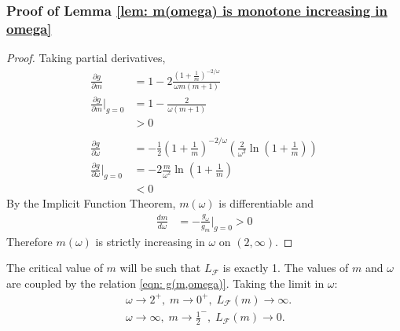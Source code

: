 \documentclass[10pt]{article}
\begin{document}
\subsubsection*{Proof of Lemma \ref{lem: m(omega) is monotone increasing in omega}}
\begin{proof}
Taking partial derivatives,
    \begin{align*}
        \frac{\partial g}{\partial m} &= 1-2\frac{(1+\frac{1}{m})^{-2/\omega}}{\omega m(m+1)}\\
        \frac{\partial g}{\partial m}\Bigg|_{g=0} &= 1-\frac{2}{\omega(m+1)}\\
        &>0\\
    \\
        \frac{\partial g}{\partial \omega} &=-\frac{1}{2}(1+\frac{1}{m})^{-2/\omega}(\frac{2}{\omega^2}\ln(1+\frac{1}{m}))\\
         \frac{\partial g}{\partial \omega}\Bigg|_{g=0}&= -2\frac{m}{\omega^2}\ln(1+\frac{1}{m})\\
        &<0 
    \end{align*}
By the Implicit Function Theorem, $m(\omega)$ is differentiable and 
\begin{align*}
    \frac{dm}{d\omega} &= -\frac{g_\omega}{g_m}\Big|_{g=0}>0
\end{align*}
Therefore $m(\omega)$ is strictly increasing in $\omega$ on $(2,\infty)$.
\end{proof}
The critical value of $m$ will be such that $L_\mathcal{F}$ is exactly 1. The values of $m$ and $\omega$ are coupled by the relation \eqref{eqn: g(m,omega)}. Taking the limit in $\omega$:
\begin{align*}
    &\omega\rightarrow 2^+,\; m\rightarrow 0^+,\; L_\mathcal{F}(m) \rightarrow \infty.\\
    &\omega\rightarrow \infty,\; m\rightarrow \frac{1}{2}^-,\; L_\mathcal{F}(m) \rightarrow 0.
\end{align*}
\end{document}

